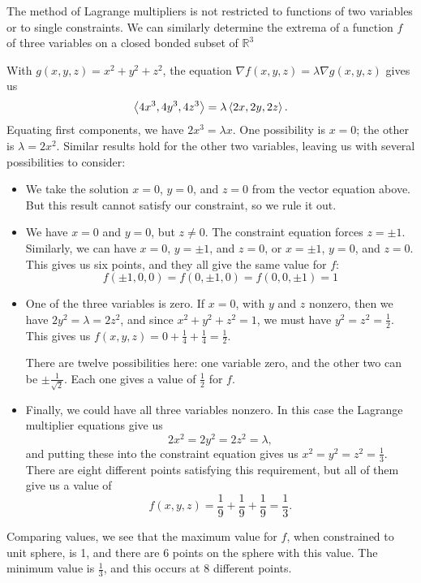 The method of Lagrange multipliers is not restricted to functions of two variables or to single constraints. We can similarly determine the extrema of a function $f$ of three variables on a closed bonded subset of $\mathbb{R}^3$\\

{
With $g(x,y,z)=x^2+y^2+z^2$, the equation $\nabla f(x,y,z)=\lambda \nabla g(x,y,z)$ gives us
\[
\left\langle 4x^3,4y^3,4z^3\right\rangle = \lambda \left\langle 2x, 2y, 2z\right\rangle.
\]
Equating first components, we have $2x^3=\lambda x$. One possibility is $x=0$; the other is $\lambda = 2x^2$. Similar results hold for the other two variables, leaving us with several possibilities to consider:
\begin{itemize}
\item We take the solution $x=0$, $y=0$, and $z=0$ from the vector equation above. But this result cannot satisfy our constraint, so we rule it out.
\item We have $x=0$ and $y=0$, but $z\neq 0$. The constraint equation forces $z=\pm 1$. Similarly, we can have $x=0$, $y=\pm 1$, and $z=0$, or $x=\pm 1$, $y=0$, and $z=0$. This gives us six points, and they all give the same value for $f$:
\[
f(\pm 1, 0, 0) = f(0,\pm 1, 0) = f(0, 0, \pm 1)=1
\]
\item One of the three variables is zero. If $x=0$, with $y$ and $z$ nonzero, then we have $2y^2=\lambda =2z^2$, and since $x^2+y^2+z^2=1$, we must have $y^2=z^2=\frac12$. This gives us $f(x,y,z) = 0+\frac14+\frac14=\frac12$.

There are twelve possibilities here: one variable zero, and the other two can be $\pm \frac{1}{\sqrt{2}}$. Each one gives a value of $\frac12$ for $f$.
\item Finally, we could have all three variables nonzero. In this case the Lagrange multiplier equations give us
\[
2x^2=2y^2=2z^2=\lambda,
\]
and putting these into the constraint equation gives us $x^2=y^2=z^2=\frac13$. There are eight different points satisfying this requirement, but all of them give us a value of 
\[
f(x,y,z)=\frac19+\frac19+\frac19=\frac13.
\] 
\end{itemize}
Comparing values, we see that the maximum value for $f$, when constrained to unit sphere, is 1, and there are 6 points on the sphere with this value. The minimum value is $\frac13$, and this occurs at 8 different points.
}\\

